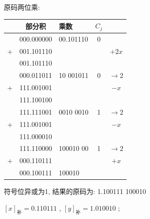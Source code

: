 \documentclass[UTF8]{report}
\newcommand{\ra}{\rightarrow}
\newcommand{\cdclass}[2]{[#1]_{\text{#2}}}
\newenvironment{solution}{{\noindent\hskip 2em \bf 解 \quad}}{}
\begin{document}
\begin{solution}
\begin{enumerate}
        原码两位乘:
        \begin{tabular}{cc|l|c|c}
             & 部分积      & 乘数      & $C_j$ & \\
            \hline
             & 000.000000 & 00.101110 & 0 & \\
            +& 001.101110 &           &   & $+2x$ \\
            \hline
             & 001.101110 &           &   & \\
             & 000.011011 & 10 001011 & 0 & $\ra 2$ \\
            +& 111.001001 &           &   & $-x $ \\
            \hline
             & 111.100100 &           &   & \\
             & 111.111001 & 0010 0010 & 1 & $\ra 2$ \\
            +& 111.001001 &           &   & $-x $ \\
            \hline
             & 111.000010 &           &   & \\
             & 111.110000 & 100010 00 & 1 & $\ra 2$ \\
            +& 000.110111 &           &   & $+x $ \\
            \hline
             & 000.100111 & 100010    &   & \\
        \end{tabular}

        符号位异或为1, 结果的原码为: 1.100111 100010
        
        $\cdclass{x}{补}=  0.110 111$ ,  $\cdclass{y}{补}= 1.010 010$ ;


\end{enumerate}
\end{solution}
\end{document}
